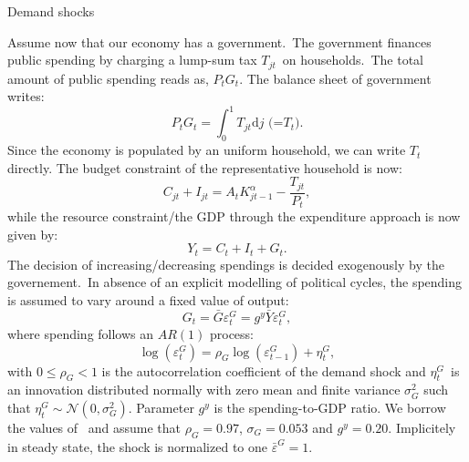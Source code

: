 \documentclass[a4paper,12pt]{article}%
\begin{document}
\begin{myexercise}{Demand shocks}
%


Assume now that our economy has a government.\ The government finances public
spending by charging a lump-sum tax $T_{jt}$\ on households.\ The total amount
of public spending reads as, $P_{t}G_{t}$. The balance sheet of government
writes:
\begin{equation}
P_{t}G_{t}=%
{\textstyle\int\nolimits_{0}^{1}}
T_{jt}\text{d}j\text{ \ (=}T_{t}\text{)}.
\end{equation}
Since the economy is populated by an uniform household, we can write $T_{t}$
directly. The budget constraint of the representative household is now:%
\begin{equation}
C_{jt}+I_{jt}=A_{t}K_{jt-1}^{\alpha}-\frac{T_{jt}}{P_{t}},
\end{equation}
while the resource constraint/the GDP through the expenditure approach is now
given by:%
\begin{equation}
Y_{t}=C_{t}+I_{t}+G_{t}.
\end{equation}
The decision of increasing/decreasing spendings is decided exogenously by the
governement.\ In absence of an explicit modelling of political cycles, the
spending is assumed to vary around a fixed value of output:%
\begin{equation}
G_{t}=\bar{G}\varepsilon_{t}^{G}=g^{y}\bar{Y}\varepsilon_{t}^{G},
\end{equation}
where spending follows an $AR(1)$ process:%
\begin{equation}
\log\left(  \varepsilon_{t}^{G}\right)  =\rho_{G}\log\left(  \varepsilon
_{t-1}^{G}\right)  +\eta_{t}^{G},
\end{equation}
with $0\leq\rho_{G}<1$ is the autocorrelation coefficient of the demand shock
and $\eta_{t}^{G}$\ is an innovation distributed normally with zero mean and
finite variance $\sigma_{G}^{2}$ such that $\eta_{t}^{G}\sim\mathcal{N}%
(0,\sigma_{G}^{2})$. Parameter $g^{y}$ is the spending-to-GDP ratio. We borrow
the values of \cite{smets2007shocks}\ and assume that $\rho_{G}=0.97$,
$\sigma_{G}=0.053$ and $g^{y}=0.20$. Implicitely in steady state, the shock is
normalized to one $\bar{\varepsilon}^{G}=1$.


\end{myexercise}
\end{document}
